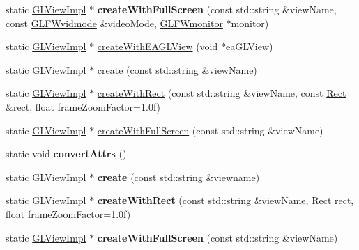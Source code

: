 \begin{DoxyCompactItemize}
static \hyperlink{classGLViewImpl}{G\+L\+View\+Impl} $\ast$ {\bfseries create\+With\+Full\+Screen} (const std\+::string \&view\+Name, const \hyperlink{structGLFWvidmode}{G\+L\+F\+Wvidmode} \&video\+Mode, \hyperlink{group__monitor_ga8d9efd1cde9426692c73fe40437d0ae3}{G\+L\+F\+Wmonitor} $\ast$monitor)
\item 
static \hyperlink{classGLViewImpl}{G\+L\+View\+Impl} $\ast$ \hyperlink{classGLViewImpl_af7e035bc07cb084d6111cb2b77827142}{create\+With\+E\+A\+G\+L\+View} (void $\ast$ea\+G\+L\+View)
\item 
static \hyperlink{classGLViewImpl}{G\+L\+View\+Impl} $\ast$ \hyperlink{classGLViewImpl_a6e699d7e719e91833b93dcfffca4d081}{create} (const std\+::string \&view\+Name)
\item 
static \hyperlink{classGLViewImpl}{G\+L\+View\+Impl} $\ast$ \hyperlink{classGLViewImpl_a390d6b69d0ff4829102833b284a00e9a}{create\+With\+Rect} (const std\+::string \&view\+Name, const \hyperlink{classRect}{Rect} \&rect, float frame\+Zoom\+Factor=1.\+0f)
\item 
static \hyperlink{classGLViewImpl}{G\+L\+View\+Impl} $\ast$ \hyperlink{classGLViewImpl_aca84dd242aa41c37bb47a196c2a8870b}{create\+With\+Full\+Screen} (const std\+::string \&view\+Name)
\item 
\mbox{\label{classGLViewImpl_a57a2b489d3c3781e86f0e972f23c8125}} 
static void {\bfseries convert\+Attrs} ()
\item 
\mbox{\label{classGLViewImpl_aec0a6a65ba1e2eccc4151d949c9e4157}} 
static \hyperlink{classGLViewImpl}{G\+L\+View\+Impl} $\ast$ {\bfseries create} (const std\+::string \&viewname)
\item 
\mbox{\label{classGLViewImpl_a4698aaca4ca46c308859c7b731bf5cc1}} 
static \hyperlink{classGLViewImpl}{G\+L\+View\+Impl} $\ast$ {\bfseries create\+With\+Rect} (const std\+::string \&view\+Name, \hyperlink{classRect}{Rect} rect, float frame\+Zoom\+Factor=1.\+0f)
\item 
\mbox{\label{classGLViewImpl_aca84dd242aa41c37bb47a196c2a8870b}} 
static \hyperlink{classGLViewImpl}{G\+L\+View\+Impl} $\ast$ {\bfseries create\+With\+Full\+Screen} (const std\+::string \&view\+Name)
\item 
\mbox{\label{classGLViewImpl_a6e699d7e719e91833b93dcfffca4d081}} 

\end{DoxyCompactItemize}
